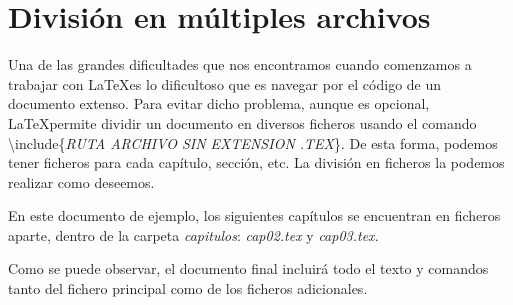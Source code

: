\documentclass[12pt]{book} %
\begin{document}
\section{División en múltiples archivos}

Una de las grandes dificultades que nos encontramos cuando comenzamos a trabajar con \LaTeX es lo dificultoso que es navegar por el código de un documento extenso. Para evitar dicho problema, aunque es opcional, \LaTeX permite dividir un documento en diversos ficheros usando el comando \textbackslash include\{\emph{RUTA ARCHIVO SIN EXTENSION .TEX}\}. De esta forma, podemos tener ficheros para cada capítulo, sección, etc. La división en ficheros la podemos realizar como deseemos.

En este documento de ejemplo, los siguientes capítulos se encuentran en ficheros aparte, dentro de la carpeta \emph{capitulos}: \emph{cap02.tex} y \emph{cap03.tex}.

Como se puede observar, el documento final incluirá todo el texto y comandos tanto del fichero principal como de los ficheros adicionales.




\end{document}
